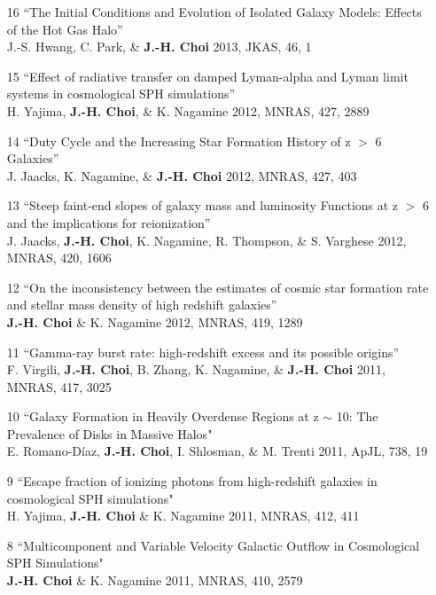 \documentclass [11pt]{article}
\begin{document}
{{\begin{enumerate}
\item[16]``The Initial Conditions and Evolution of Isolated Galaxy Models: Effects of the Hot Gas Halo'' \\ J.-S. Hwang, C. Park, \& \textbf{J.-H. Choi} 2013, JKAS, 46, 1

\item[15]``Effect of radiative transfer on damped Lyman-alpha and Lyman limit systems in cosmological SPH simulations''\\ H. Yajima, \textbf{J.-H. Choi}, \& K. Nagamine 2012, MNRAS, 427, 2889

\item[14]``Duty Cycle and the Increasing Star Formation History of z $>$ 6 Galaxies''\\ J. Jaacks, K. Nagamine, \& \textbf{J.-H. Choi} 2012, MNRAS, 427, 403

\item[13]``Steep faint-end slopes of galaxy mass and luminosity Functions at z $>$ 6 and the implications for reionization''\\ J. Jaacks, \textbf{J.-H. Choi}, K. Nagamine, R. Thompson, \& S. Varghese 2012, MNRAS, 420, 1606 

\item[12]``On the inconsistency between the estimates of cosmic star formation rate and stellar mass density of high redshift galaxies''\\ \textbf{J.-H. Choi} \& K. Nagamine 2012, MNRAS, 419, 1289

\item[11]``Gamma-ray burst rate: high-redshift excess and its possible origins''\\ F. Virgili, \textbf{J.-H. Choi}, B. Zhang, K. Nagamine, \& \textbf{J.-H. Choi} 2011, MNRAS, 417, 3025

\item[10]``Galaxy Formation in Heavily Overdense Regions at z $\sim$ 10: The Prevalence of Disks in Massive Halos" \\  E. Romano-D\'{i}az, \textbf{J.-H. Choi}, I. Shlosman, \& M. Trenti 2011, ApJL, 738, 19

\item[9]``Escape fraction of ionizing photons from high-redshift galaxies in cosmological SPH simulations" \\  H. Yajima, \textbf{J.-H. Choi} \& K. Nagamine 2011, MNRAS, 412, 411

\item[8]``Multicomponent and Variable Velocity Galactic Outflow in Cosmological SPH Simulations" \\  \textbf{J.-H. Choi} \& K. Nagamine 2011, MNRAS, 410, 2579  


\end{enumerate}}}
\end{document}
